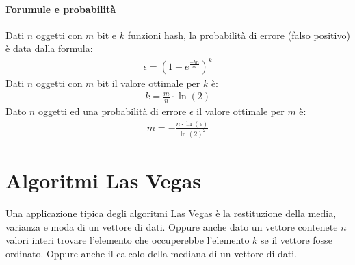         \paragraph{Forumule e probabilità}
            Dati $n$ oggetti con $m$ bit e $k$ funzioni hash, la probabilità di errore (falso positivo) è data dalla formula:
            \begin{align*}
                \epsilon = \left(1-e^{\frac{-kn}{m}}\right)^k
            \end{align*}
            Dati $n$ oggetti con $m$ bit il valore ottimale per $k$ è:
            \begin{align*}
                k = \frac{m}{n}\cdot\operatorname{ln}(2)
            \end{align*}
            Dato $n$ oggetti ed una probabilità di errore $\epsilon$ il valore ottimale per $m$ è:
            \begin{align*}
                m = -\frac{n\cdot\operatorname{ln}(\epsilon)}{\operatorname{ln}(2)^2}
            \end{align*}
\section{Algoritmi Las Vegas}
    Una applicazione tipica degli algoritmi Las Vegas è la restituzione della media, varianza e moda di un vettore di dati. Oppure anche dato un vettore contenete $n$ valori interi trovare l'elemento che occuperebbe l'elemento $k$ se il vettore fosse ordinato. Oppure anche il calcolo della mediana di un vettore di dati. 
